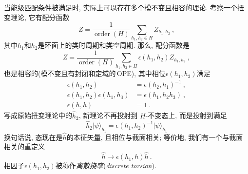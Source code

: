 当能级匹配条件被满足时, 实际上可以存在多个模不变且相容的理论. 考察一个扭变理论, 它有配分函数
\begin{equation}
    Z=\frac{1}{\operatorname{order}(H)}\sum_{h_{1},h_{2}\in H}Z_{h_{1},h_{2}} \:, \label{11.3.7}
\end{equation}
其中$ h_{1} $和$ h_{2} $是环面上的类时周期和类空周期. 那么, 配分函数是
\begin{equation}
    Z=\frac{1}{\operatorname{order}(H)}\sum_{h_{1},h_{2}\in H}\epsilon(h_{1},h_{2}) Z_{h_{1},h_{2}} \:, \label{11.3.8}
\end{equation}
也是相容的(模不变且有封闭和定域的\,OPE), 其中相位$ \epsilon(h_{1},h_{2}) $满足
\begin{subequations}
\begin{align}
    \epsilon(h_{1},h_{2}) &= \epsilon(h_{2},h_{1})^{-1} \:, \label{11.3.9a} \\
    \epsilon(h_{1},h_{2})\epsilon(h_{1},h_{3}) &= \epsilon(h_{1},h_{2}h_{3}) \:,\label{11.3.9b} \\
    \epsilon(h,h) &= 1 \:. \label{11.3.9c}
\end{align} \label{11.3.9}
\end{subequations}
写成原始扭变理论中的$ \hat{h}_{2}$, 新理论不再投射到 $H$-不变态上, 而是投射到满足
\begin{equation}
\hat{h}_{2}\lvert\psi\rangle_{h_{1}} = \epsilon(h_{1},h_{2})^{-1}\lvert \psi\rangle_{h_{1}} \label{11.3.10}    
\end{equation}
换句话说, 态现在是$ \hat{h} $的本征矢量, 且相位与截面相关; 等价地, 我们有一个与截面相关的重定义
\begin{equation}
    \hat{h}\to \epsilon(h_{1},h)\hat{h} \:. \label{11.3.11}
\end{equation}
相因子$ \epsilon(h_{1},h_{2}) $被称作{\emph{离散挠率}}(\emph{discrete torsion}).

